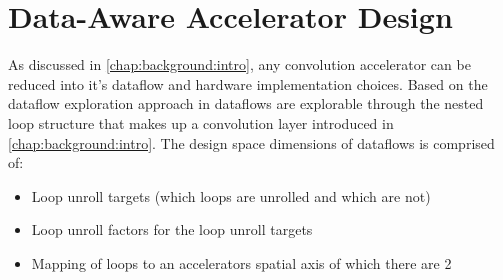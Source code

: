 \chapter{Data-Aware Accelerator Design}
\label{chap:dataflow_dse:intro}

As discussed in \autoref{chap:background:intro}, any convolution accelerator can
be reduced into it's dataflow and hardware implementation choices. Based on the
dataflow exploration approach in \cite{dnn_df_overrated_v1} dataflows are
explorable through the nested loop structure that makes up a convolution
layer introduced in \autoref{chap:background:intro}.
The design space dimensions of dataflows is comprised of:
\begin{itemize}
    \item Loop unroll targets (which loops are unrolled and which are not) 
    \item Loop unroll factors for the loop unroll targets
    \item Mapping of loops to an accelerators spatial axis of which there are 2
\end{itemize}

